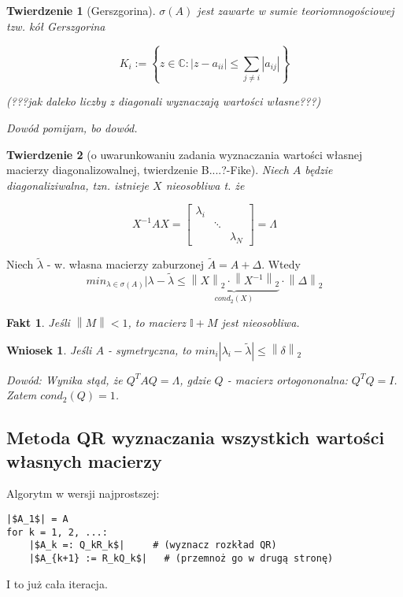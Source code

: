 \documentclass[hidelinks,a4paper,fleqn,oneside]{book}
\newcommand{\II}{\mathbb{I}}
\newcommand{\CC}{\mathbb{C}}
\newcommand{\norm}[1]{\left\lVert#1\right\rVert}
\newtheorem{wniosek}{Wniosek}
\newtheorem{fakt}{Fakt}
\newtheorem{twierdz}{Twierdzenie}
\begin{document}
\begin{twierdz}[Gerszgorina] $\sigma(A)$ jest zawarte w sumie teoriomnogościowej tzw. kół Gerszgorina
	
	\[
		K_{i} := \left\{ z \in \CC: |z - a_{ii} | \leq \sum_{j \neq i} |a_{ij}| \right\}
	\]
	
	(???jak daleko liczby z diagonali wyznaczają wartości własne???)
	
	
	Dowód pomijam, bo dowód.
	
\end{twierdz}

\begin{twierdz}[o uwarunkowaniu zadania wyznaczania wartości własnej macierzy diagonalizowalnej, twierdzenie B....?-Fike]
	Niech $A$ będzie diagonaliziwalna, tzn. istnieje $X$ nieosobliwa t. że
	
	\[
		X^{-1}AX = \left[ \begin{array}{ccc} \lambda_i & & \\ & \ddots \\ & & \lambda_N \end{array} \right] = \Lambda
	\]
\end{twierdz}

Niech $\tilde{\lambda}$ - w. własna macierzy zaburzonej $\tilde{A} = A + \Delta$. Wtedy
\[
	min_{\lambda \in \sigma(A)} |\lambda - \tilde{\lambda} \leq \underbrace{\norm{X} _2 \cdot \norm{X^{-1}}_2}_{cond_2(X)} \cdot \norm{\Delta}_2
\]

\begin{fakt}Jeśli $\norm{M} < 1$, to macierz $\II+M$ jest nieosobliwa.
\end{fakt}

\begin{wniosek}
	Jeśli $A$ - symetryczna, to $min_i |\lambda_i - \tilde{\lambda}| \leq \norm{\delta}_2$
	
	Dowód: Wynika stąd, że $Q^TAQ = \Lambda$, gdzie $Q$ - macierz ortogononalna: $Q^TQ = I$. Zatem $cond_2(Q) = 1$.
\end{wniosek}

\subsection{Metoda QR wyznaczania wszystkich wartości własnych macierzy}
Algorytm w wersji najprostszej:
\begin{verbatim}
|$A_1$| = A
for k = 1, 2, ...:
    |$A_k =: Q_kR_k$|     # (wyznacz rozkład QR)
    |$A_{k+1} := R_kQ_k$|   # (przemnoż go w drugą stronę)
\end{verbatim}
I to już cała iteracja.
\end{document}
